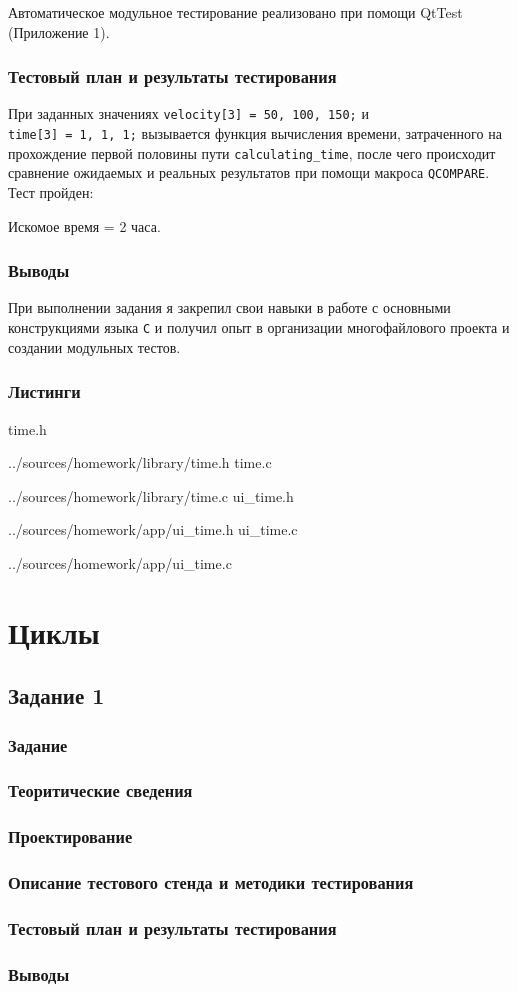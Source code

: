 \documentclass[12pt,a4paper]{report}
\begin{document}
Автоматическое модульное тестирование реализовано при помощи QtTest (Приложение 1).

\subsection{Тестовый план и результаты тестирования}
\hspace{\parindent}При заданных значениях \mbox{\texttt{velocity[3] = {50, 100, 150;}}} и \\\mbox{\texttt{time[3] = {1, 1, 1;}}} вызывается функция вычисления времени, затраченного на прохождение первой половины пути \texttt{calculating\_time}, после чего происходит сравнение ожидаемых и реальных результатов при помощи макроса \texttt{QCOMPARE}. Тест пройден: 
\begin{center}Искомое время = 2 часа.\end{center}

\subsection{Выводы}
\hspace{\parindent}При выполнении задания я закрепил свои навыки в работе с основными конструкциями языка \texttt{C} и получил опыт в организации многофайлового проекта и создании модульных тестов.

\newpage
\subsection*{Листинги}
time.h

{../sources/homework/library/time.h}
time.c

{../sources/homework/library/time.c}
ui\_time.h

{../sources/homework/app/ui_time.h}
ui\_time.c

{../sources/homework/app/ui_time.c}
\newpage

\chapter{Циклы}
\section{Задание 1}
\subsection{Задание}
\subsection{Теоритические сведения}
\subsection{Проектирование}
\subsection{Описание тестового стенда и методики тестирования}
\subsection{Тестовый план и результаты тестирования}
\subsection{Выводы}
\end{document}
